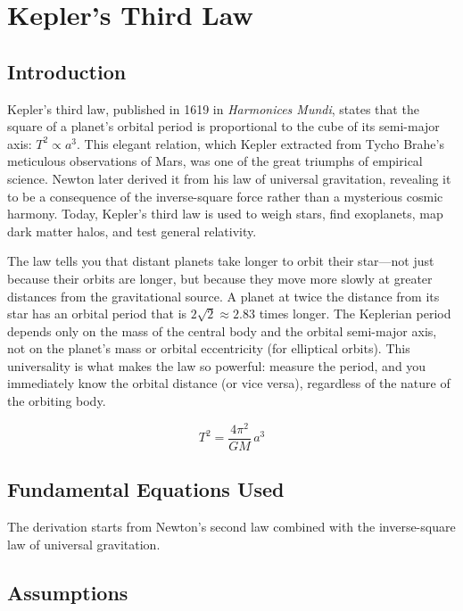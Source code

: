 \chapter{Kepler's Third Law}

\section*{Introduction}

Kepler's third law, published in 1619 in \textit{Harmonices Mundi}, states that the square of a planet's orbital period is proportional to the cube of its semi-major axis: $T^2 \propto a^3$. This elegant relation, which Kepler extracted from Tycho Brahe's meticulous observations of Mars, was one of the great triumphs of empirical science. Newton later derived it from his law of universal gravitation, revealing it to be a consequence of the inverse-square force rather than a mysterious cosmic harmony. Today, Kepler's third law is used to weigh stars, find exoplanets, map dark matter halos, and test general relativity.

The law tells you that distant planets take longer to orbit their star---not just because their orbits are longer, but because they move more slowly at greater distances from the gravitational source. A planet at twice the distance from its star has an orbital period that is $2\sqrt{2} \approx 2.83$ times longer. The Keplerian period depends only on the mass of the central body and the orbital semi-major axis, not on the planet's mass or orbital eccentricity (for elliptical orbits). This universality is what makes the law so powerful: measure the period, and you immediately know the orbital distance (or vice versa), regardless of the nature of the orbiting body.


\begin{equation}
T^2 = \frac{4\pi^2}{GM}\,a^3
\end{equation}

\section*{Fundamental Equations Used}

The derivation starts from Newton's second law combined with the inverse-square law of universal gravitation.

\section*{Assumptions}

